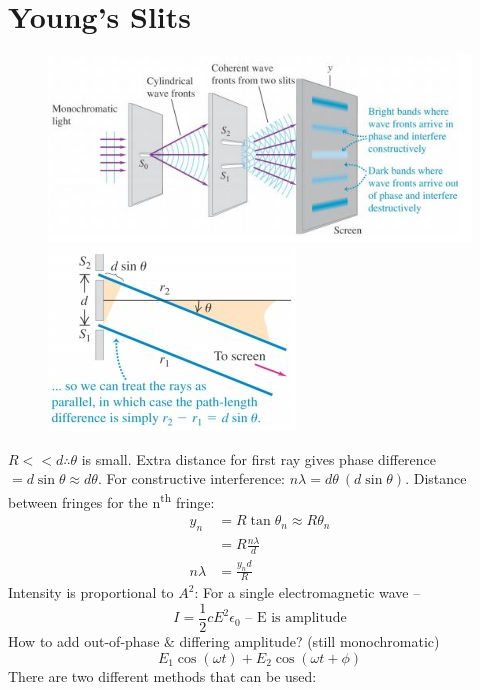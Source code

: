 \documentclass[a4paper, 11pt, normalem]{report}
\begin{document}
\section{Young's Slits}
\begin{figure}[H]
    \centering
    \includegraphics{Young1.jpg}
    \includegraphics{Young2.jpg}
\end{figure}
$R << d \therefore \theta$ is small.
Extra distance for first ray gives phase difference $= d\sin{\theta} \approx d\theta$.
For constructive interference: $n\lambda = d\theta~(d\sin{\theta})$.
Distance between fringes for the n\textsuperscript{th} fringe:
\begin{align}
    y_{n} &= R\tan{\theta_{n}} \approx R\theta_{n} \\
          &= R\frac{n\lambda}{d}\\
    n\lambda &= \frac{y_{n}d}{R}
\end{align}
Intensity is proportional to $A^{2}$:
For a single electromagnetic wave --
\begin{equation}
    I = \frac{1}{2}cE^{2}\epsilon_{0}\text{ -- E is amplitude}
\end{equation}
How to add out-of-phase \& differing amplitude? (still monochromatic)
\begin{equation}
    E_{1}\cos{(\omega t)} + E_{2}\cos{(\omega t + \phi)}
\end{equation}
There are two different methods that can be used:
\end{document}
